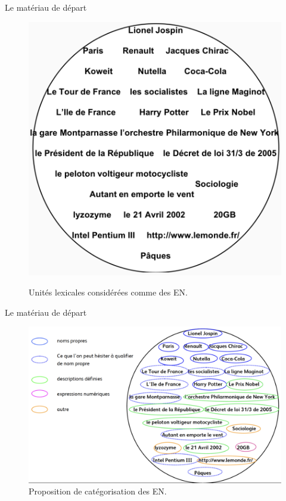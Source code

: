 \documentclass[xetex,xcolor={table,usenames,dvipsnames}]{beamer}
\begin{document}
\begin{frame}{Le \og{}matériau\fg{} de départ}
	 
			\begin{figure}[h] %
			\centering
			\includegraphics[width=.6\linewidth]{img/materiau_depart.png}
			\label{fig:ling_out_TAL}
			\caption{Unités lexicales considérées comme des \textsc{EN}.}
		\end{figure}

\end{frame}

\begin{frame}{Le \og{}matériau de départ\fg{}}
				\begin{figure}[h] %
		\centering
		\includegraphics[width=1\linewidth]{img/materiau_depart2.png}
		\caption{Proposition de catégorisation des \textsc{EN}.}
		\label{fig:ling_out_TAL}
	\end{figure}
\end{frame}
\end{document}
